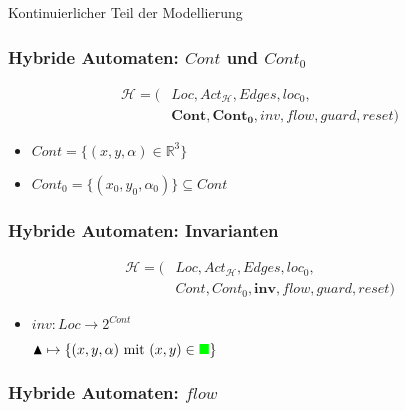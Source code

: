 \documentclass[ngerman]{beamer}
\begin{document}
\begin{section}{Kontinuierlicher Teil der Modellierung}

\begin{frame}
    \frametitle{Hybride Automaten: $\mathit{Cont}$ und $\mathit{Cont}_0$}

    \begin{align*}
        \mathcal{H} = ( & \mathit{Loc}, \mathit{Act}_{\mathcal{H}}, \mathit{Edges}, \mathit{loc}_0, \\
                        & \mathbf{Cont}, \mathbf{Cont}_\mathbf{0}, \mathit{inv}, \mathit{flow}, \mathit{guard}, \mathit{reset} )
    \end{align*}

    \begin{itemize}
        \item $\mathit{Cont} = \{ (x, y, \alpha ) \in \mathbb{R}^3 \} $
        \item $\mathit{Cont}_0 = \{ (x_0, y_0, \alpha_0) \} \subseteq \mathit{Cont} $
    \end{itemize}
\end{frame}

\begin{frame}
    \frametitle{Hybride Automaten: Invarianten}

    \begin{align*}
        \mathcal{H} = ( & \mathit{Loc}, \mathit{Act}_{\mathcal{H}}, \mathit{Edges}, \mathit{loc}_0, \\
                        & \mathit{Cont}, \mathit{Cont}_0, \mathbf{inv}, \mathit{flow}, \mathit{guard}, \mathit{reset} )
    \end{align*}

    \begin{itemize}
        \item $\mathit{inv}: \mathit{Loc} \rightarrow 2^\mathit{Cont}$

            \begin{figure}
                \centering
                \def\svgwidth{0.3\columnwidth}
                
            \end{figure}

            $\blacktriangle \mapsto \{ (x, y, \alpha) \text{ mit } (x, y) \in \textcolor{green}{\blacksquare} \}$
    \end{itemize}
\end{frame}

\begin{frame}
    \frametitle{Hybride Automaten: $\mathit{flow}$}


\end{frame}
\end{section}
\end{document}
